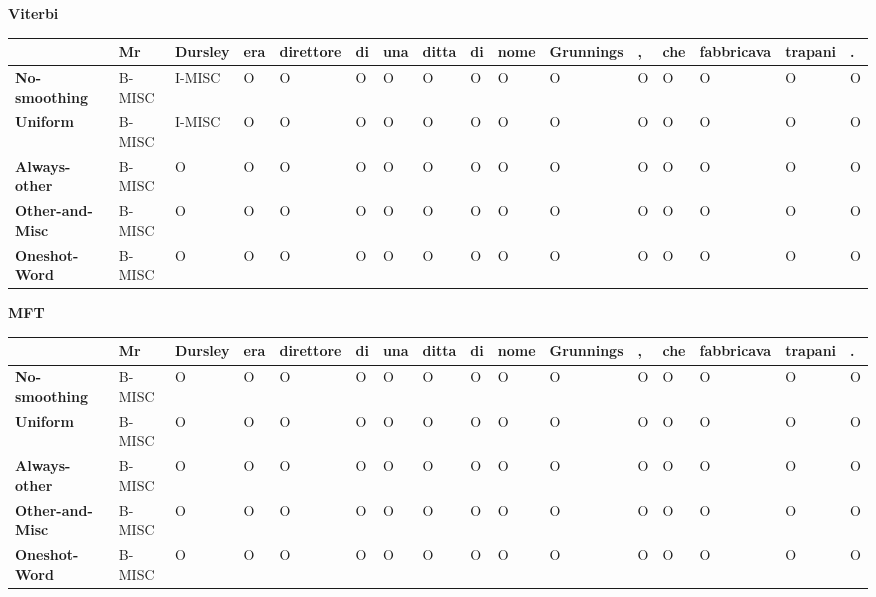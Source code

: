 \documentclass[a4paper,11pt,notitlepage]{report}
\begin{document}
\begin{center}\textbf{Viterbi}\end{center}
\begin{center}
\scriptsize
\setlength{\tabcolsep}{1.5pt}
\begin{tabular}{|l|l|l|l|l|l|l|l|l|l|l|l|l|l|l|l|}
\hline
\textbf{} & \textbf{Mr} & \textbf{Dursley} & \textbf{era} & \textbf{direttore} & \textbf{di} & \textbf{una} & \textbf{ditta} & \textbf{di} & \textbf{nome} & \textbf{Grunnings} & \textbf{,} & \textbf{che} & \textbf{fabbricava} & \textbf{trapani} & \textbf{.} \\ \hline
\textbf{No-smoothing} & B-MISC & I-MISC & O & O & O & O & O & O & O & O & O & O & O & O & O \\ \hline
\textbf{Uniform} & B-MISC & I-MISC & O & O & O & O & O & O & O & O & O & O & O & O & O \\ \hline
\textbf{Always-other} & B-MISC & O & O & O & O & O & O & O & O & O & O & O & O & O & O \\ \hline
\textbf{Other-and-Misc} & B-MISC & O & O & O & O & O & O & O & O & O & O & O & O & O & O \\ \hline
\textbf{Oneshot-Word} & B-MISC & O & O & O & O & O & O & O & O & O & O & O & O & O & O \\ \hline
\end{tabular}
\end{center}

\begin{center}\textbf{MFT}\end{center}
\begin{center}
\scriptsize
\setlength{\tabcolsep}{1.5pt}
\begin{tabular}{|l|l|l|l|l|l|l|l|l|l|l|l|l|l|l|l|}
\hline
\textbf{} & \textbf{Mr} & \textbf{Dursley} & \textbf{era} & \textbf{direttore} & \textbf{di} & \textbf{una} & \textbf{ditta} & \textbf{di} & \textbf{nome} & \textbf{Grunnings} & \textbf{,} & \textbf{che} & \textbf{fabbricava} & \textbf{trapani} & \textbf{.} \\ \hline
\textbf{No-smoothing} & B-MISC & O & O & O & O & O & O & O & O & O & O & O & O & O & O \\ \hline
\textbf{Uniform} & B-MISC & O & O & O & O & O & O & O & O & O & O & O & O & O & O \\ \hline
\textbf{Always-other} & B-MISC & O & O & O & O & O & O & O & O & O & O & O & O & O & O \\ \hline
\textbf{Other-and-Misc} & B-MISC & O & O & O & O & O & O & O & O & O & O & O & O & O & O \\ \hline
\textbf{Oneshot-Word} & B-MISC & O & O & O & O & O & O & O & O & O & O & O & O & O & O \\ \hline
\end{tabular}
\end{center}
\end{document}

